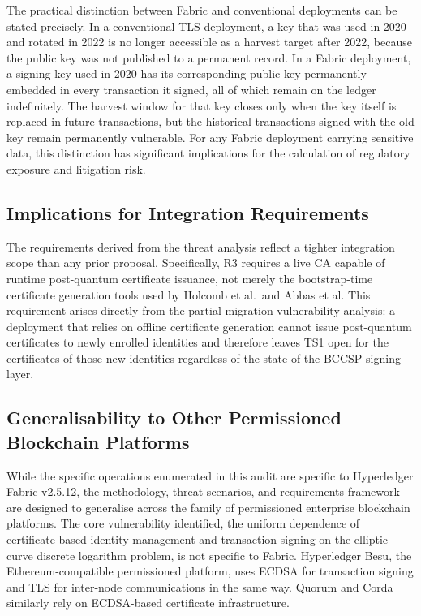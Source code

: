 \documentclass[conference]{IEEEtran}
\begin{document}
The practical distinction between Fabric and conventional deployments
can be stated precisely. In a conventional TLS deployment, a key that
was used in 2020 and rotated in 2022 is no longer accessible as a
harvest target after 2022, because the public key was not published
to a permanent record. In a Fabric deployment, a signing key used in
2020 has its corresponding public key permanently embedded in every
transaction it signed, all of which remain on the ledger indefinitely.
The harvest window for that key closes only when the key itself is
replaced in future transactions, but the historical transactions signed
with the old key remain permanently vulnerable. For any Fabric deployment
carrying sensitive data, this distinction has significant implications
for the calculation of regulatory exposure and litigation risk.

\subsection{Implications for Integration Requirements}

The requirements derived from the threat analysis reflect a tighter
integration scope than any prior proposal. Specifically, R3 requires a
live CA capable of runtime post-quantum certificate issuance, not merely
the bootstrap-time certificate generation tools used by Holcomb et al.\
and Abbas et al. This requirement arises directly from the partial
migration vulnerability analysis: a deployment that relies on offline
certificate generation cannot issue post-quantum certificates to newly
enrolled identities and therefore leaves TS1 open for the certificates
of those new identities regardless of the state of the BCCSP signing
layer.

\subsection{Generalisability to Other Permissioned Blockchain Platforms}

While the specific operations enumerated in this audit are specific to
Hyperledger Fabric v2.5.12, the methodology, threat scenarios, and
requirements framework are designed to generalise across the family of
permissioned enterprise blockchain platforms. The core vulnerability
identified, the uniform dependence of certificate-based identity
management and transaction signing on the elliptic curve discrete
logarithm problem, is not specific to Fabric. Hyperledger Besu, the
Ethereum-compatible permissioned platform, uses ECDSA for transaction
signing and TLS for inter-node communications in the same way. Quorum
and Corda similarly rely on ECDSA-based certificate infrastructure.
\end{document}

